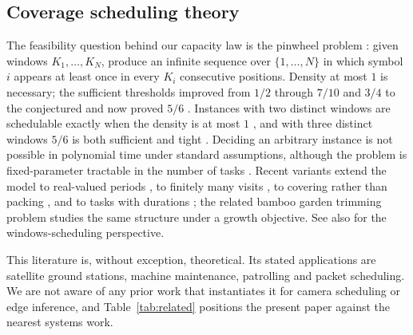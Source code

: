 \documentclass[preprint,review,12pt]{elsarticle}
\theoremstyle{definition}
\newcommand{\Nc}{N}
\newcommand{\Ki}{K_i}
\begin{document}
\subsection{Coverage scheduling theory}
The feasibility question behind our capacity law is the pinwheel problem
\cite{holte1989pinwheel}: given windows $K_1,\dots,K_\Nc$, produce an infinite sequence over
$\{1,\dots,\Nc\}$ in which symbol $i$ appears at least once in every $\Ki$ consecutive positions.
Density at most $1$ is necessary; the sufficient thresholds improved from $1/2$
\cite{holte1989pinwheel} through $7/10$ \cite{chanchin1993schedulers,chanchin1992general} and
$3/4$ \cite{fishburn2002densities} to the conjectured and now proved $5/6$
\cite{kawamura2024stoc,kawamura2026pnas}. Instances with two distinct windows are schedulable
exactly when the density is at most $1$ \cite{holte1992two}, and with three distinct windows
$5/6$ is both sufficient and tight \cite{linlin1997three}. Deciding an arbitrary instance is not
possible in polynomial time under standard assumptions, although the problem is fixed-parameter
tractable in the number of tasks \cite{kobayashi2025isaac}. Recent variants extend the model to
real-valued periods \cite{fujiwara2026real}, to finitely many visits
\cite{kanellopoulos2025kvisits,kanellopoulos2026finite}, to covering rather than packing
\cite{kawamura2025covering}, and to tasks with durations \cite{kusano2026sofsem}; the related
bamboo garden trimming problem \cite{gasieniec2024bamboo} studies the same structure under a
growth objective. See also \cite{jacobs2014windows} for the windows-scheduling perspective.

This literature is, without exception, theoretical. Its stated applications are satellite ground
stations, machine maintenance, patrolling and packet scheduling. We are not aware of any prior
work that instantiates it for camera scheduling or edge inference, and Table~\ref{tab:related}
positions the present paper against the nearest systems work.
\end{document}
